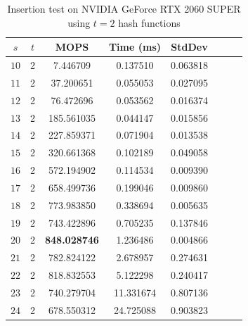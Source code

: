 \documentclass[10pt,twocolumn,letterpaper]{article}
\begin{document}
\begin{table}[h]
    \centering
   \begin{tabular}{@{}c|ccccccc@{}}
\toprule
$s$  & $t$ & MOPS    & Time (ms)& StdDev  \\ \midrule
$10$ & 2   & 7.446709  & 0.137510 & 0.063818 \\
$11$ & 2   & 37.200651 & 0.055053 & 0.027095 \\
$12$ & 2   & 76.472696 & 0.053562 & 0.016374 \\
$13$ & 2   &185.561035 & 0.044147 & 0.015856 \\
$14$ & 2   &227.859371& 0.071904 & 0.013538 \\
$15$ & 2   &320.661368& 0.102189 & 0.049058 \\
$16$ & 2   &572.194902& 0.114534 & 0.009390 \\ 
$17$ & 2   &658.499736& 0.199046 & 0.009860 \\ 
$18$ & 2   &773.983850& 0.338694 & 0.005635 \\ 
$19$ & 2   &743.422896& 0.705235 & 0.137846 \\ 
$20$ & 2   &\textbf{848.028746}& 1.236486 & 0.004866 \\ 
$21$ & 2   &782.824122& 2.678957 & 0.274631 \\ 
$22$ & 2   &818.832553& 5.122298 & 0.240417 \\ 
$23$ & 2   &740.279704& 11.331674& 0.807136 \\ 
$24$ & 2   &678.550312& 24.725088& 0.903823\\ 
\bottomrule
\end{tabular}
    \caption{Insertion test on NVIDIA GeForce RTX 2060 SUPER using $t = 2$ hash functions}
    \label{tab:insert_2_2060}
\end{table}
\end{document}
